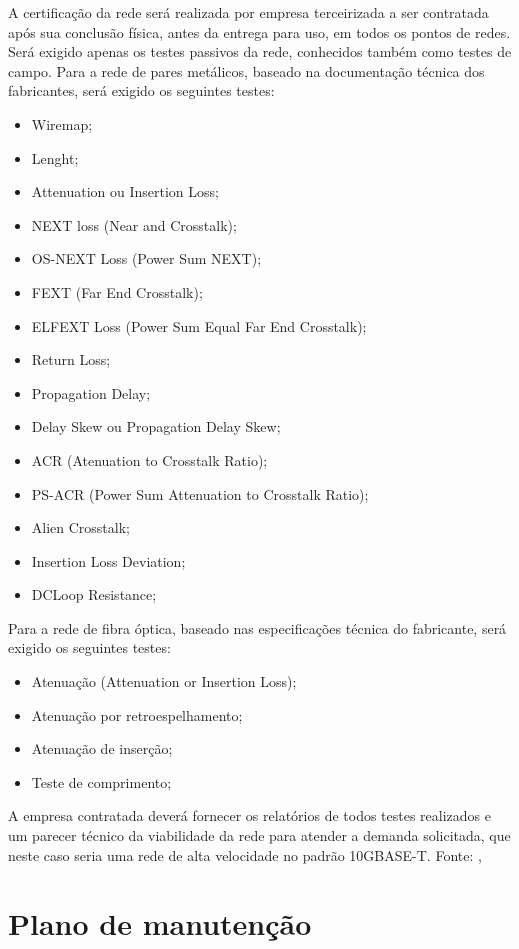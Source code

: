 \documentclass[	DIV=calc,%
							paper=a4,%
							fontsize=12pt,%
							onecolumn]{scrartcl}	 					%
\begin{document}
A certificação da rede será realizada por empresa terceirizada a ser contratada após sua conclusão física, antes da entrega para uso, em todos os pontos de redes. Será exigido apenas os testes passivos da rede, conhecidos também como testes de campo. Para a rede de pares metálicos, baseado na documentação técnica dos fabricantes,  será exigido os seguintes testes:
\begin{itemize}	
	\item Wiremap;
	\item Lenght;
	\item Attenuation ou Insertion Loss;
	\item NEXT loss (Near and Crosstalk);
	\item OS-NEXT Loss (Power Sum NEXT);
	\item FEXT (Far End Crosstalk);
	\item ELFEXT Loss (Power Sum Equal Far End Crosstalk);
	\item Return Loss;
	\item Propagation Delay;
	\item Delay Skew ou Propagation Delay Skew;
	\item ACR (Atenuation to Crosstalk Ratio);
	\item PS-ACR (Power Sum Attenuation to Crosstalk Ratio);
	\item Alien Crosstalk;
	\item Insertion Loss Deviation;
	\item DCLoop Resistance;	
\end{itemize}

Para a rede de fibra óptica, baseado nas especificações técnica do fabricante, será exigido os seguintes testes:
\begin{itemize}	
	\item Atenuação (Attenuation or Insertion Loss);
	\item Atenuação por retroespelhamento;
	\item Atenuação de inserção;
	\item Teste de comprimento;
\end{itemize}

A empresa contratada deverá fornecer os relatórios de todos testes realizados e um parecer técnico da viabilidade da rede para atender a demanda solicitada, que neste caso seria uma rede de alta velocidade no padrão 10GBASE-T. Fonte: \cite{ID2}, \cite{ID3}


\section{Plano de manutenção}
\end{document}
